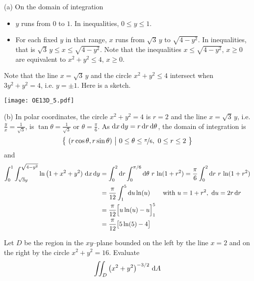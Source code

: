 \begin{solution}
(a) On the domain of integration 
\begin{itemize}
\item
$y$ runs from $0$ to $1$. In inequalities, $0\le y\le 1$.
\item
For each fixed $y$ in that range, $x$ runs from $\sqrt{3}\,y$ to
$\sqrt{4-y^2}$. In inequalities, that is $\sqrt{3}\,y\le x\le \sqrt{4-y^2}$.
Note that the inequalities $x\le \sqrt{4-y^2}$, $x\ge 0$ are equivalent to
$x^2+y^2\le 4$, $x\ge 0$.
\end{itemize}
Note that the line $x=\sqrt{3}\, y$ and the circle $x^2+y^2\le 4$
intersect when $3y^2+y^2=4$, i.e. $y=\pm 1$.
Here is a sketch.

\begin{center}
     \texttt{[image: OE13D\_5.pdf]}
\end{center}

(b)
In polar coordinates, the circle $x^2+y^2= 4$ is $r=2$ and the
line $x=\sqrt{3}\, y$, i.e. $\frac{y}{x} =\frac{1}{\sqrt{3}}$, 
is $\tan\theta=\frac{1}{\sqrt{3}}$ or $\theta=\frac{\pi}{6}$.
As $\mathrm{d}x\,\mathrm{d}y = r\,\mathrm{d}r\,\mathrm{d}\theta$,
the domain of integration is
\begin{align*}
\big\{ \ (r\cos\theta,r\sin\theta)\ \big|\ 0\le \theta\le\nicefrac{\pi}{6},\ 0\le r\le 2\ \big\}
\end{align*}
and
\begin{align*}
\int_0^1 \int_{\sqrt{3}y}^{\sqrt{4-y^2}} \ln\big(1+x^2+y^2)\
                         \mathrm{d}x\,\mathrm{d}y
&= \int_0^2\mathrm{d}r\int_0^{\pi/6}\mathrm{d}\theta\ r\,\ln(1+r^2)
= \frac{\pi}{6}\int_0^2\mathrm{d}r\ r\,\ln(1+r^2) \\
&=\frac{\pi}{12}\int_1^5 \mathrm{d}u \ln(u)
        \qquad\text{with }u=1+r^2,\ \mathrm{d}u=2r\,\mathrm{d}r \\
&=\frac{\pi}{12}\Big[u\ln(u)-u\Big]_1^5 \\
&=\frac{\pi}{12}\big[5\ln(5)-4\big]
\end{align*}
\end{solution}

\begin{question}[M200 2014A] %
Let $D$ be the region in the $xy$--plane bounded on the left by the line 
$x = 2$ and on the right by the circle $x^2 + y^2 = 16$. Evaluate
\begin{equation*}
\dblInt_D\big(x^2+y^2\big)^{-3/2}\ \dee{A}
\end{equation*}
\end{question}

%

